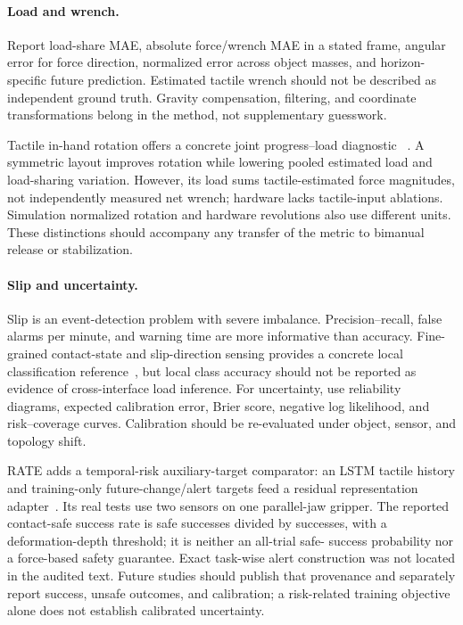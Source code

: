 \paragraph{Load and wrench.}
Report load-share MAE, absolute force/wrench MAE in a stated frame, angular error
for force direction, normalized error across object masses, and horizon-specific
future prediction. Estimated tactile wrench should not be described as independent
ground truth. Gravity compensation, filtering, and coordinate transformations
belong in the method, not supplementary guesswork.

Tactile in-hand rotation offers a concrete joint progress--load diagnostic
~\cite{update2026tactilerotationmorphology}. A symmetric layout improves rotation
while lowering pooled estimated load and load-sharing variation. However, its
load sums tactile-estimated force magnitudes, not independently measured net
wrench; hardware lacks tactile-input ablations. Simulation normalized rotation
and hardware revolutions also use different units. These distinctions should
accompany any transfer of the metric to bimanual release or stabilization.

\paragraph{Slip and uncertainty.}
Slip is an event-detection problem with severe imbalance. Precision--recall,
false alarms per minute, and warning time are more informative than accuracy.
Fine-grained contact-state and slip-direction sensing provides a concrete local
classification reference~\cite{ma2026slip}, but local class accuracy should not
be reported as evidence of cross-interface load inference.
For uncertainty, use reliability diagrams, expected calibration error, Brier
score, negative log likelihood, and risk--coverage curves. Calibration should be
re-evaluated under object, sensor, and topology shift.

RATE adds a temporal-risk auxiliary-target comparator: an LSTM tactile history
and training-only future-change/alert targets feed a residual representation
adapter~\cite{jiang2026rate}. Its real tests use two sensors on one parallel-jaw
gripper. The reported contact-safe success rate is safe successes divided by
successes, with a deformation-depth threshold; it is neither an all-trial safe-
success probability nor a force-based safety guarantee. Exact task-wise alert
construction was not located in the audited text. Future studies should publish
that provenance and separately report success, unsafe outcomes, and calibration;
a risk-related training objective alone does not establish calibrated uncertainty.

